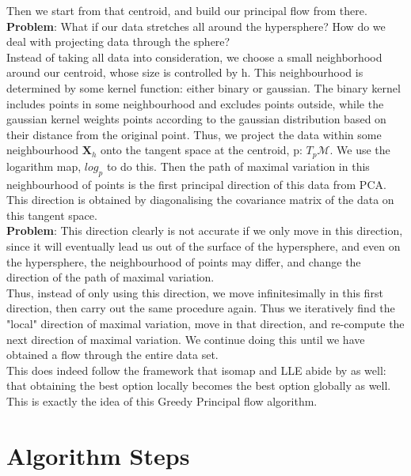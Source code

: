 \documentclass[12pt]{report}
\begin{document}
Then we start from that centroid, and build our principal flow from there.
\textbf{Problem}:
What if our data stretches all around the hypersphere? How do we deal with projecting
data through the sphere?\\
Instead of taking all data into consideration, we choose a small neighborhood around
our centroid, whose size is controlled by h. This neighbourhood is determined 
by some kernel function: either binary or gaussian. The binary kernel 
includes points in some neighbourhood and excludes points outside,
while the gaussian kernel weights points according to 
the gaussian distribution based on their distance from the original point. Thus, we
project the data within some neighbourhood $\mathbf{X}_h$ onto the tangent space 
at the centroid, p: $T_p\mathcal{M}$. We use the logarithm map, $log_p$ to do this. 
Then the path of maximal variation in this neighbourhood of points 
is the first principal direction of this data from PCA. This direction 
is obtained by diagonalising the covariance matrix of the data on this tangent
space. \\
\textbf{Problem}:
This direction clearly is not accurate if we only move in this direction,
since it will eventually lead us out of the surface of the hypersphere, and even on the 
hypersphere, the neighbourhood of points may differ, and change the direction 
of the path of maximal variation.\\
Thus, instead of only using this direction, we move infinitesimally in this first direction,
then carry out the same procedure again. Thus we iteratively find the "local"
direction of maximal variation, move in that direction, and re-compute the next direction
of maximal variation. We continue doing this until we have obtained a flow through the
entire data set.\\
This does indeed follow the framework that isomap and LLE abide by
as well: that obtaining the best option locally becomes the best option globally as well. 
This is exactly the idea of this Greedy Principal flow algorithm. 

\section{Algorithm Steps}
\end{document}
